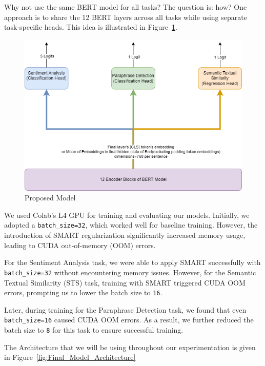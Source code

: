 Why not use the same BERT model for all tasks? The question is: how? One approach is to share the 12 BERT layers across all tasks while using separate task-specific heads. This idea is illustrated in Figure~\ref{fig:Proposed Model}.
\begin{figure}[H]
    \centering
    \includegraphics[width=0.8\linewidth]{Figures/Proposed_Model.png}
    \caption{Proposed Model}
    \label{fig:Proposed Model}
\end{figure}

We used Colab's L4 GPU for training and evaluating our models. Initially, we adopted a \texttt{batch\_size=32}, which worked well for baseline training. However, the introduction of SMART regularization significantly increased memory usage, leading to CUDA out-of-memory (OOM) errors.

For the Sentiment Analysis task, we were able to apply SMART successfully with \texttt{batch\_size=32} without encountering memory issues. However, for the Semantic Textual Similarity (STS) task, training with SMART triggered CUDA OOM errors, prompting us to lower the batch size to \texttt{16}.

Later, during training for the Paraphrase Detection task, we found that even \texttt{batch\_size=16} caused CUDA OOM errors. As a result, we further reduced the batch size to \texttt{8} for this task to ensure successful training.

The Architecture that we will be using throughout our experimentation is given in Figure~\ref{fig:Final_Model_Architecture}


